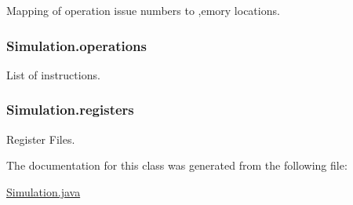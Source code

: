 \-Mapping of operation issue numbers to ,emory locations. 

\hypertarget{classSimulation_a9569c59ef6447bb109d924ab08b952db}{
\subsubsection[{operations}]{ {\bf \-Simulation.\-operations}}}\label{classSimulation_a9569c59ef6447bb109d924ab08b952db}


\-List of instructions. 

\hypertarget{classSimulation_a72082ebb1736f61f976fb4795c6446a6}{
\subsubsection[{registers}]{ {\bf \-Simulation.\-registers}}}\label{classSimulation_a72082ebb1736f61f976fb4795c6446a6}


\-Register \-Files. 



\-The documentation for this class was generated from the following file\-:\begin{DoxyCompactItemize}
\item 
\hyperlink{Simulation_8java}{\-Simulation.\-java}\end{DoxyCompactItemize}
